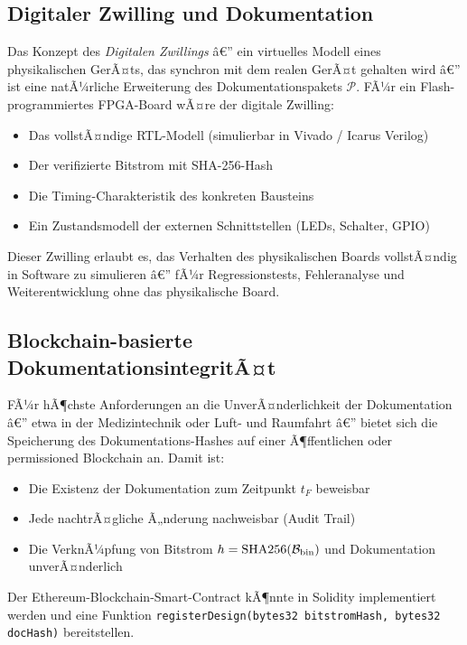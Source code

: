 ﻿\documentclass[a4paper,12pt]{article}
\theoremstyle{definition}
\begin{document}
\subsection{Digitaler Zwilling und Dokumentation}

Das Konzept des \emph{Digitalen Zwillings} â€” ein virtuelles Modell eines
physikalischen GerÃ¤ts, das synchron mit dem realen GerÃ¤t gehalten wird â€”
ist eine natÃ¼rliche Erweiterung des Dokumentationspakets
$\mathcal{P}$. FÃ¼r ein Flash-programmiertes FPGA-Board wÃ¤re der
digitale Zwilling:
\begin{itemize}
    \item Das vollstÃ¤ndige RTL-Modell (simulierbar in Vivado / Icarus Verilog)
    \item Der verifizierte Bitstrom mit SHA-256-Hash
    \item Die Timing-Charakteristik des konkreten Bausteins
    \item Ein Zustandsmodell der externen Schnittstellen (LEDs, Schalter, GPIO)
\end{itemize}

Dieser Zwilling erlaubt es, das Verhalten des physikalischen Boards vollstÃ¤ndig
in Software zu simulieren â€” fÃ¼r Regressionstests, Fehleranalyse und
Weiterentwicklung ohne das physikalische Board.

\subsection{Blockchain-basierte DokumentationsintegritÃ¤t}

FÃ¼r hÃ¶chste Anforderungen an die UnverÃ¤nderlichkeit der Dokumentation â€”
etwa in der Medizintechnik oder Luft- und Raumfahrt â€” bietet sich die
Speicherung des Dokumentations-Hashes auf einer Ã¶ffentlichen oder
permissioned Blockchain an. Damit ist:
\begin{itemize}
    \item Die Existenz der Dokumentation zum Zeitpunkt $t_F$ beweisbar
    \item Jede nachtrÃ¤gliche Ã„nderung nachweisbar (Audit Trail)
    \item Die VerknÃ¼pfung von Bitstrom $h = \mathrm{SHA256}(\mathcal{B}_{\rm bin})$
          und Dokumentation unverÃ¤nderlich
\end{itemize}

Der Ethereum-Blockchain-Smart-Contract kÃ¶nnte in Solidity implementiert werden
und eine Funktion \texttt{registerDesign(bytes32 bitstromHash, bytes32 docHash)}
bereitstellen.
\end{document}
